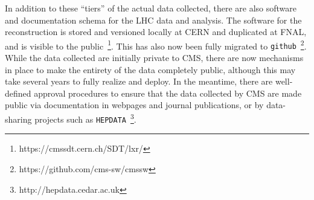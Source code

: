 \documentclass[12pt]{proposalnsf}
\begin{document}
In addition to these ``tiers'' of the actual data collected, there are
also software and documentation schema for the LHC data and analysis. 
The software for the reconstruction is stored and versioned locally at
CERN and duplicated at FNAL, and is visible to the
public~\footnote{https://cmssdt.cern.ch/SDT/lxr/}. This has also now
been fully migrated to {\tt github}~\footnote{https://github.com/cms-sw/cmssw}.  
While the data collected are initially
private to CMS, there are now mechanisms in place to make the entirety
of the data completely public, although this may take several years to
fully realize and deploy. In the meantime, there are well-defined
approval procedures to ensure that the data collected by CMS are made
public via documentation in webpages and journal publications, or by
data-sharing projects such as 
{\tt HEPDATA}~\footnote{http://hepdata.cedar.ac.uk}. 
\end{document}
